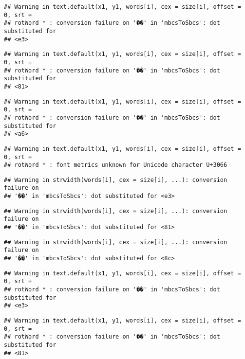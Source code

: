 \documentclass[]{article}
\begin{document}
\begin{verbatim}
## Warning in text.default(x1, y1, words[i], cex = size[i], offset = 0, srt =
## rotWord * : conversion failure on '��' in 'mbcsToSbcs': dot substituted for
## <e3>
\end{verbatim}

\begin{verbatim}
## Warning in text.default(x1, y1, words[i], cex = size[i], offset = 0, srt =
## rotWord * : conversion failure on '��' in 'mbcsToSbcs': dot substituted for
## <81>
\end{verbatim}

\begin{verbatim}
## Warning in text.default(x1, y1, words[i], cex = size[i], offset = 0, srt =
## rotWord * : conversion failure on '��' in 'mbcsToSbcs': dot substituted for
## <a6>
\end{verbatim}

\begin{verbatim}
## Warning in text.default(x1, y1, words[i], cex = size[i], offset = 0, srt =
## rotWord * : font metrics unknown for Unicode character U+3066
\end{verbatim}

\begin{verbatim}
## Warning in strwidth(words[i], cex = size[i], ...): conversion failure on
## '��' in 'mbcsToSbcs': dot substituted for <e3>
\end{verbatim}

\begin{verbatim}
## Warning in strwidth(words[i], cex = size[i], ...): conversion failure on
## '��' in 'mbcsToSbcs': dot substituted for <81>
\end{verbatim}

\begin{verbatim}
## Warning in strwidth(words[i], cex = size[i], ...): conversion failure on
## '��' in 'mbcsToSbcs': dot substituted for <8c>
\end{verbatim}

\begin{verbatim}
## Warning in text.default(x1, y1, words[i], cex = size[i], offset = 0, srt =
## rotWord * : conversion failure on '��' in 'mbcsToSbcs': dot substituted for
## <e3>
\end{verbatim}

\begin{verbatim}
## Warning in text.default(x1, y1, words[i], cex = size[i], offset = 0, srt =
## rotWord * : conversion failure on '��' in 'mbcsToSbcs': dot substituted for
## <81>
\end{verbatim}
\end{document}
